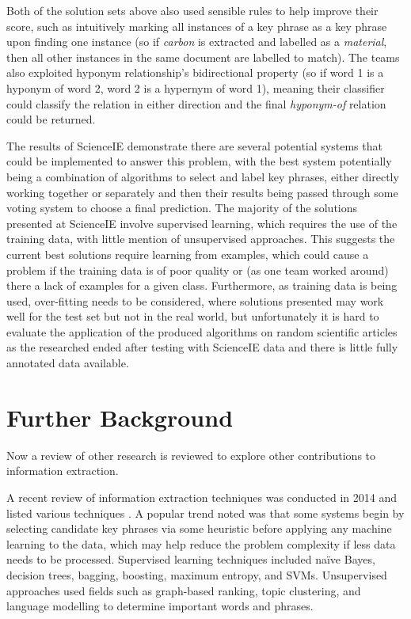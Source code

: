 Both of the solution sets above also used sensible rules to help improve their score, such as intuitively marking all instances of a key phrase as a key phrase upon finding one instance (so if \textit{carbon} is extracted and labelled as a \textit{material}, then all other instances in the same document are labelled to match). The teams also exploited hyponym relationship’s bidirectional property (so if word 1 is a hyponym of word 2, word 2 is a hypernym of word 1), meaning their classifier could classify the relation in either direction and the final \textit{hyponym-of} relation could be returned.

The results of ScienceIE demonstrate there are several potential systems that could be implemented to answer this problem, with the best system potentially being a combination of algorithms to select and label key phrases, either directly working together or separately and then their results being passed through some voting system to choose a final prediction. The majority of the solutions presented at ScienceIE involve supervised learning, which requires the use of the training data, with little mention of unsupervised approaches. This suggests the current best solutions require learning from examples, which could cause a problem if the training data is of poor quality or (as one team worked around) there a lack of examples for a given class. Furthermore, as training data is being used, over-fitting needs to be considered, where solutions presented may work well for the test set but not in the real world, but unfortunately it is hard to evaluate the application of the produced algorithms on random scientific articles as the researched ended after testing with ScienceIE data and there is little fully annotated data available.

\section{Further Background}
Now a review of other research is reviewed to explore other contributions to information extraction.

A recent review of information extraction techniques was conducted in 2014 and listed various techniques \cite{Hasan2014}. A popular trend noted was that some systems begin by selecting candidate key phrases via some heuristic before applying any machine learning to the data, which may help reduce the problem complexity if less data needs to be processed. Supervised learning techniques included naïve Bayes, decision trees, bagging, boosting, maximum entropy, and SVMs. Unsupervised approaches used fields such as graph-based ranking, topic clustering, and language modelling to determine important words and phrases. 

